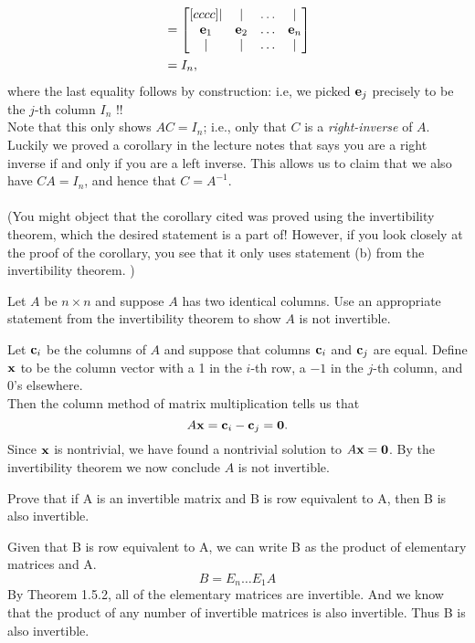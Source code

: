 \begin{solution}
\begin{align*}
&=\begin{bmatrix}[cccc]\vert&\vert &\dots &\vert\\ {\mathbf e}_1&{\mathbf e}_2&\dots&{\mathbf e}_n\\\vert&\vert &\dots &\vert \end{bmatrix}\\
&=I_n,
\end{align*}
where the last equality follows by construction: i.e, we picked ${\mathbf e}_j$ precisely to be the $j$-th column $I_n$ !!
\\
Note that this only shows $AC=I_n$; i.e., only that $C$ is a {\em right-inverse} of $A$. Luckily we proved a corollary in the lecture notes that says you are a right inverse if and only if you are a left inverse. This allows us to claim that we also have $CA=I_n$, and hence that $C=A^{-1}$. 
\\ \\
(You might object that the corollary cited was proved using the invertibility theorem, which the desired statement is a part of! However, if you look closely at the proof of the corollary, you see that it only uses statement (b) from the invertibility theorem. )
\end{solution}
\ii Let $A$ be $n\times n$ and suppose $A$ has two identical columns. Use an appropriate statement from the invertibility theorem to show $A$ is not invertible. 
\\
\begin{solution}
\noindent Let ${\mathbf c}_i$ be the columns of $A$ and suppose that columns ${\mathbf c}_i$ and ${\mathbf c}_j$ are equal. Define ${\mathbf x}$ to be the column vector with a 1 in the $i$-th row, a $-1$ in the $j$-th column, and 0's elsewhere. \\
Then the column method of matrix multiplication tells us that 
\[
A{\mathbf x}={\mathbf c}_i-{\mathbf c}_j={\mathbf 0}.
\] 
Since ${\mathbf x}$ is nontrivial, we have found a nontrivial solution to $A{\mathbf x}={\mathbf 0}$. By the invertibility theorem we now conclude $A$ is not invertible. 
\end{solution}

\ii Prove that if A is an invertible matrix and B is row equivalent to A, then B is also invertible.
\begin{solution}
Given that B is row equivalent to A, we can write B as the product of elementary matrices and A.\\
$$ B = E_n\dots E_1A$$
By Theorem 1.5.2, all of the elementary matrices are invertible. And we know that the product of any number of invertible matrices is also invertible. Thus B is also invertible.
\end{solution}

